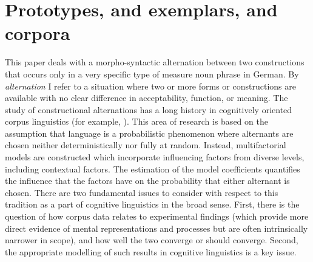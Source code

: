 \section{Prototypes, and exemplars, and corpora}
\label{sec:cogocl}

This paper deals with a morpho-syntactic alternation between two constructions that occurs only in a very specific type of measure noun phrase in German.
By \textit{alternation} I refer to a situation where two or more forms or constructions are available with no clear difference in acceptability, function, or meaning.
The study of constructional alternations has a long history in cognitively oriented corpus linguistics (for example, \citealp{BresnanEa2007,BresnanHay2010,BresnanFord2010,DivjakArppe2013,Gries2015,NessetJanda2010,Wulff2003}).
This area of research is based on the assumption that language is a probabilistic phenomenon \citep{Bresnan2007} where alternants are chosen neither deterministically nor fully at random.
Instead, multifactorial models are constructed which incorporate influencing factors from diverse levels, including contextual factors.
The estimation of the model coefficients quantifies the influence that the factors have on the probability that either alternant is chosen.
There are two fundamental issues to consider with respect to this tradition as a part of cognitive linguistics in the broad sense.
First, there is the question of how corpus data relates to experimental findings (which provide more direct evidence of mental representations and processes but are often intrinsically narrower in scope), and how well the two converge or should converge.
Second, the appropriate modelling of such results in cognitive linguistics is a key issue.

